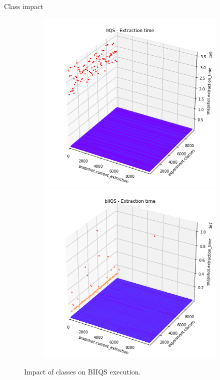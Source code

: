 \documentclass{beamer}
\begin{document}
\begin{frame}{Class impact}
    \begin{figure}
        \centering
        \begin{subfigure}[b]{\textwidth}
            \centering
            \includegraphics[height=0.6\textheight]{chapter4/01-basebenchmark-05-classes.png.0-1.png}
            \includegraphics[height=0.6\textheight]{chapter5/01-basebenchmark-05-classes.png.0-1.png}
        \end{subfigure}
        \caption{Impact of classes on BIIQS execution.}
    \end{figure}
\end{frame}
\end{document}
